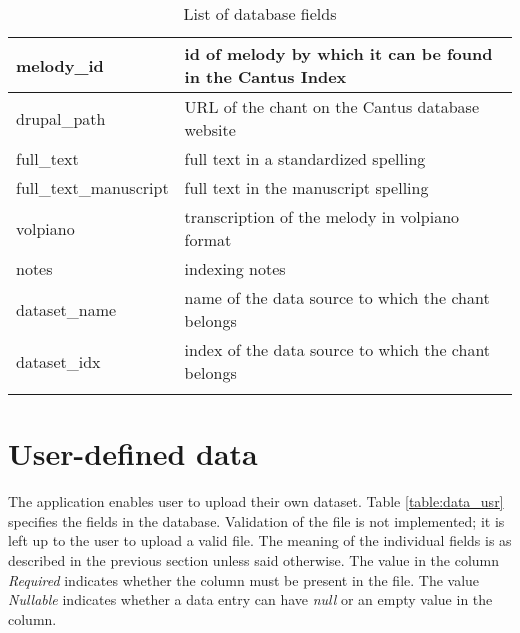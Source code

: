 \begin{longtable}{| p{} | p{} |}
 melody\_id     & id of melody by which it can be found in the Cantus Index \\ \hline
 drupal\_path   & URL of the chant on the Cantus database website \\ \hline
 full\_text     & full text in a standardized spelling \\ \hline
 full\_text\_manuscript & full text in the manuscript spelling \\ \hline
 volpiano       & transcription of the melody in volpiano format \\ \hline
 notes          & indexing notes \\ \hline
 dataset\_name  & name of the data source to which the chant belongs \\ \hline
 dataset\_idx   & index of the data source to which the chant belongs \\
 \hline

\caption{List of database fields}
\label{table:data_db}
\end{longtable}

\section{User-defined data}
\label{section:data_usr}

The application enables user to upload their own dataset. Table \ref{table:data_usr} specifies the fields in the database. Validation of the
file is not implemented; it is left up to the user to upload a valid file. The meaning of the individual
fields is as described in the previous section unless said otherwise. The value in the column \emph{Required} indicates whether
the column must be present in the file. The value \emph{Nullable} indicates whether a data entry can have \emph{null} or an empty value in the column.

